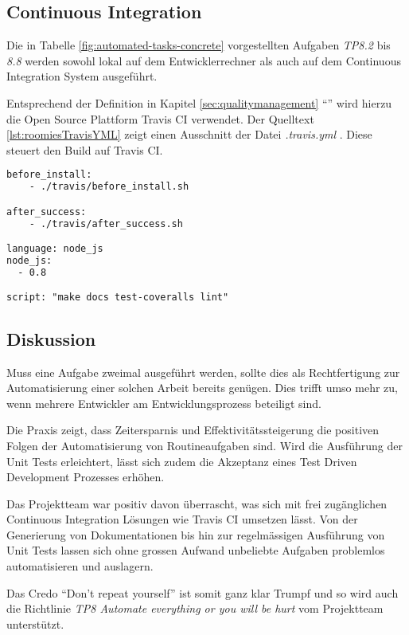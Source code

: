 \subsection*{Continuous Integration}

Die in Tabelle \ref{fig:automated-tasks-concrete} vorgestellten Aufgaben \emph{TP8.2} bis \emph{8.8} werden sowohl lokal auf dem Entwicklerrechner als auch auf dem Continuous Integration System ausgeführt.

Entsprechend der Definition in Kapitel \ref{sec:qualitymanagement} ``'' wird hierzu die Open Source Plattform Travis CI \cite{TravisCI} verwendet. Der Quelltext \ref{lst:roomiesTravisYML} zeigt einen Ausschnitt der Datei \emph{.travis.yml} \cite{RoomiesTravisYML}. Diese steuert den Build auf Travis CI.

\begin{lstlisting}[language=XML, firstnumber=5, caption={Ausschnit aus .travis.yml \cite{RoomiesTravisYML}}, label=lst:roomiesTravisYML]
before_install:
    - ./travis/before_install.sh

after_success:
    - ./travis/after_success.sh

language: node_js
node_js:
  - 0.8

script: "make docs test-coveralls lint"
\end{lstlisting}

\subsection*{Diskussion}
Muss eine Aufgabe zweimal ausgeführt werden, sollte dies als Rechtfertigung zur Automatisierung einer solchen Arbeit bereits genügen. Dies trifft umso mehr zu, wenn mehrere Entwickler am Entwicklungsprozess beteiligt sind.

Die Praxis zeigt, dass Zeitersparnis und Effektivitätssteigerung die positiven Folgen der Automatisierung von Routineaufgaben sind. Wird die Ausführung der Unit Tests erleichtert, lässt sich zudem die Akzeptanz eines Test Driven Development Prozesses erhöhen.

Das Projektteam war positiv davon überrascht, was sich mit frei zugänglichen Continuous Integration Lösungen wie Travis CI \cite{TravisCI} umsetzen lässt. Von der Generierung von Dokumentationen bis hin zur regelmässigen Ausführung von Unit Tests lassen sich ohne grossen Aufwand unbeliebte Aufgaben problemlos automatisieren und auslagern.

Das Credo ``Don't repeat yourself'' ist somit ganz klar Trumpf und so wird auch die Richtlinie \emph{TP8 Automate everything or you will be hurt} vom Projektteam unterstützt.